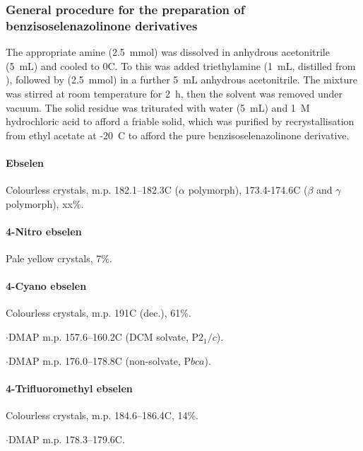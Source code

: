 \begin{refsection}
\subsubsection[General procedure for the preparation of benzisoselenazolinone derivatives]{General procedure for the preparation of benzisoselenazolinone derivatives }
The appropriate amine (2.5~mmol) was dissolved in anhydrous acetonitrile (5~mL) and cooled to 0\degree C.
To this was added triethylamine (1~mL, distilled from ), followed by  (2.5~mmol) in a further 5~mL anhydrous acetonitrile.
The mixture was stirred at room temperature for 2~h, then the solvent was removed under vacuum.
The solid residue was triturated with water (5~mL) and 1~\textsc{M} hydrochloric acid to afford a friable solid, which was purified by recrystallisation from ethyl acetate at -20\degree~C to afford the pure benzisoselenazolinone derivative.

\paragraph{Ebselen }
Colourless crystals, m.p. 182.1--182.3\degree C ($\alpha$ polymorph), 173.4-174.6\degree C ($\beta$ and $\gamma$ polymorph), xx\%.

\paragraph{4-Nitro ebselen }
Pale yellow crystals, 7\%.

\paragraph{4-Cyano ebselen }
Colourless crystals, m.p. 191\degree C (dec.), 61\%.

$\cdot$DMAP m.p. 157.6--160.2\degree C (DCM solvate, P$2_1/c$).

$\cdot$DMAP m.p. 176.0--178.8\degree C (non-solvate, P$bca$).

\paragraph{4-Trifluoromethyl ebselen }
Colourless crystals, m.p. 184.6--186.4\degree C, 14\%.

$\cdot$DMAP m.p. 178.3--179.6\degree C.


\end{refsection}
